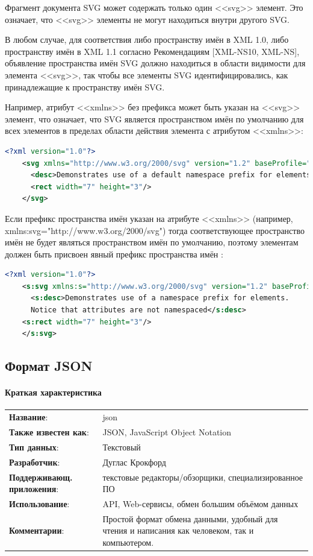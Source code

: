 Фрагмент документа SVG может содержать только один <<svg>> элемент. Это означает, что <<svg>> элементы не могут находиться внутри другого SVG.

В любом случае, для соответствия либо пространству имён в XML 1.0, либо пространству имён в XML 1.1 согласно Рекомендациям [XML-NS10, XML-NS], объявление пространства имён SVG должно находиться в области видимости для элемента <<svg>>, так чтобы все элементы SVG идентифицировались, как принадлежащие к пространству имён SVG.

Например, атрибут <<xmlns>> без префикса может быть указан на <<svg>> элемент, что означает, что SVG является пространством имён по умолчанию для всех элементов в пределах области действия элемента с атрибутом <<xmlns>>:
\begin{lstlisting}[language=XML,label=list:xml]
	<?xml version="1.0"?>
	<svg xmlns="http://www.w3.org/2000/svg" version="1.2" baseProfile="tiny">
	  <desc>Demonstrates use of a default namespace prefix for elements.</desc>
	  <rect width="7" height="3"/>
	</svg>
\end{lstlisting}

Если префикс пространства имён указан на атрибуте <<xmlns>> (например, xmlns:svg="http://www.w3.org/2000/svg") тогда соответствующее пространство имён не будет являться пространством имён по умолчанию, поэтому элементам должен быть присвоен явный префикс пространства имён \cite{andersson2008scalable}:
\begin{lstlisting}[language=XML,label=list:xml]
	<?xml version="1.0"?>
	<s:svg xmlns:s="http://www.w3.org/2000/svg" version="1.2" baseProfile="tiny">
	  <s:desc>Demonstrates use of a namespace prefix for elements.
	  Notice that attributes are not namespaced</s:desc>
	<s:rect width="7" height="3"/>
	</s:svg>
\end{lstlisting}

\subsection{Формат JSON} \label{subs:json}
\paragraph{Краткая характеристика}

\begin{longtable}{p{110pt} p{340pt}}
	\label{tab:svg}
	\centering
	\textbf{Название}:&json\\
	\textbf{Также известен как}:&JSON, JavaScript Object Notation\\
	\textbf{Тип данных}:&Текстовый\\
	\textbf{Разработчик}:&Дуглас Крокфорд\\
	\textbf{Поддерживающ. приложения}:&текстовые редакторы/обзорщики, специализированное ПО\\
	\textbf{Использование}:&API, Web-сервисы, обмен большим объёмом данных\\
	\textbf{Комментарии}:&Простой формат обмена данными, удобный для чтения и написания как человеком, так и компьютером.\\
\end{longtable}

